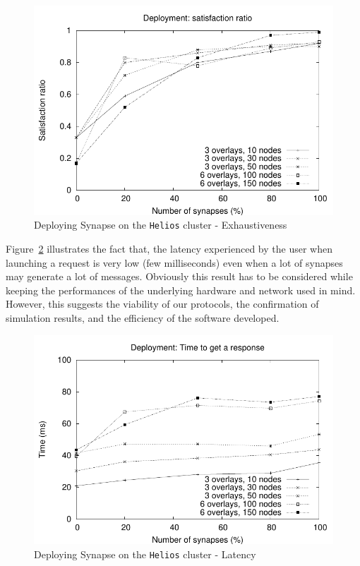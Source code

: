 \begin{figure}
        \includegraphics[width=\linewidth]{fig/dep1-sat.pdf}
        \caption{Deploying Synapse on the {\tt Helios} cluster -
        Exhaustiveness\label{dep:1-sat}}
\end{figure}

Figure~\ref{dep:1-time} illustrates the fact that, the latency
experienced by the user when launching a request is very low (few
milliseconds) even when a lot of synapses may generate a lot of
messages. Obviously this result has to be considered while keeping the
performances of the underlying hardware and network used in
mind. However, this suggests the viability of our protocols, the
confirmation of simulation results, and the efficiency of the software
developed.

\begin{figure}
        \includegraphics[width=\linewidth]{fig/dep1-time.pdf}
        \caption{Deploying Synapse on the {\tt Helios} cluster - Latency}
        \label{dep:1-time}
\end{figure}

